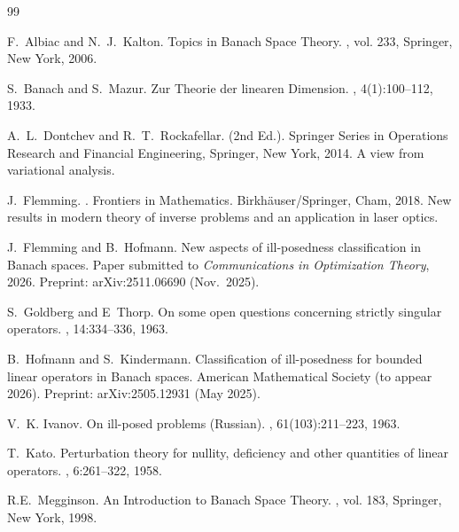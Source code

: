 \documentclass[12pt,twoside,reqno]{amsart}
\theoremstyle{definition}
\numberwithin{equation}{section}
\begin{document}
\begin{thebibliography}{99}%

F.~Albiac and N.~J.~Kalton.
\newblock Topics in Banach Space Theory.
, vol. 233, Springer, New York, 2006.


S.~Banach and S.~Mazur.
\newblock  Zur Theorie der linearen Dimension.
, 4(1):100--112, 1933.

A.~L.~Dontchev and R.~T.~Rockafellar.
 (2nd Ed.).
\newblock Springer Series in Operations Research and
  Financial Engineering, Springer, New York, 2014.
\newblock A view from variational analysis.

J.~Flemming.
.
\newblock Frontiers in Mathematics. Birkh\"{a}user/Springer, Cham, 2018.
\newblock New results in modern theory of inverse problems and an application
  in laser optics.


J.~Flemming and B.~Hofmann.
\newblock New aspects of ill-posedness classification in Banach spaces.
\newblock Paper submitted to {\em Communications in Optimization Theory}, 2026.
\newblock Preprint: arXiv:2511.06690 (Nov.~2025).

S.~Goldberg and E~Thorp.
\newblock On some open questions concerning strictly singular operators.
, 14:334--336, 1963.

B.~Hofmann and S.~Kindermann.
\newblock Classification of ill-posedness for bounded linear operators in {B}anach spaces.
\newblock American Mathematical Society (to appear 2026).
\newblock Preprint: arXiv:2505.12931 (May 2025).

V.~K. Ivanov.
\newblock On ill-posed problems (Russian).
, 61(103):211--223, 1963.

T.~Kato.
\newblock Perturbation theory for nullity, deficiency and other quantities of linear operators.
, 6:261--322, 1958.


R.E.~Megginson.
\newblock An Introduction to Banach Space Theory.
, vol. 183, Springer, New York, 1998.



\end{thebibliography}
\end{document}
